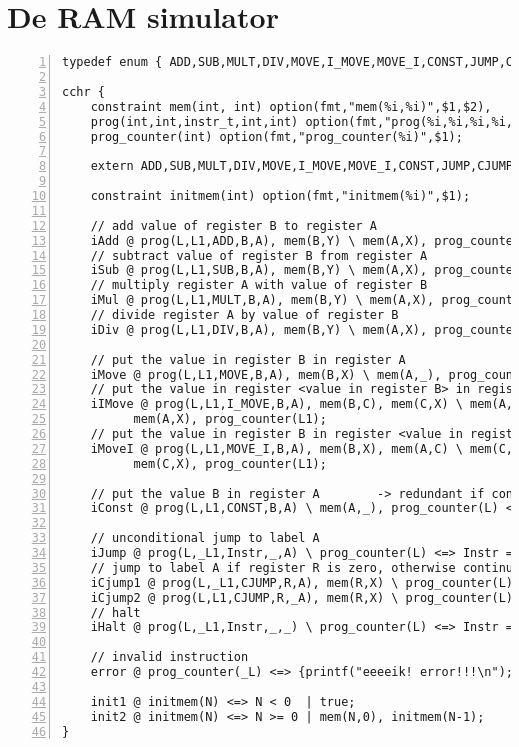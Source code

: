 \section{De RAM simulator} \label{sec:ram-cchr}

{\scriptsize
\begin{Verbatim}[frame=single,numbers=left]
typedef enum { ADD,SUB,MULT,DIV,MOVE,I_MOVE,MOVE_I,CONST,JUMP,CJUMP,HALT } instr_t;

cchr {
	constraint mem(int, int) option(fmt,"mem(%i,%i)",$1,$2), 
	prog(int,int,instr_t,int,int) option(fmt,"prog(%i,%i,%i,%i,%i)",$1,$2,$3,$4,$5),
	prog_counter(int) option(fmt,"prog_counter(%i)",$1);
	
	extern ADD,SUB,MULT,DIV,MOVE,I_MOVE,MOVE_I,CONST,JUMP,CJUMP,HALT;
		
	constraint initmem(int) option(fmt,"initmem(%i)",$1);
	
	// add value of register B to register A
	iAdd @ prog(L,L1,ADD,B,A), mem(B,Y) \ mem(A,X), prog_counter(L) <=> mem(A,X+Y), prog_counter(L1);
	// subtract value of register B from register A
	iSub @ prog(L,L1,SUB,B,A), mem(B,Y) \ mem(A,X), prog_counter(L) <=> mem(A,X-Y), prog_counter(L1);
	// multiply register A with value of register B
	iMul @ prog(L,L1,MULT,B,A), mem(B,Y) \ mem(A,X), prog_counter(L) <=> mem(A,X*Y), prog_counter(L1);
	// divide register A by value of register B
	iDiv @ prog(L,L1,DIV,B,A), mem(B,Y) \ mem(A,X), prog_counter(L) <=> mem(A,X/Y), prog_counter(L1);

	// put the value in register B in register A
	iMove @ prog(L,L1,MOVE,B,A), mem(B,X) \ mem(A,_), prog_counter(L) <=> mem(A,X), prog_counter(L1);
	// put the value in register <value in register B> in register A
	iIMove @ prog(L,L1,I_MOVE,B,A), mem(B,C), mem(C,X) \ mem(A,_), prog_counter(L) <=> 
          mem(A,X), prog_counter(L1);
	// put the value in register B in register <value in register A>
	iMoveI @ prog(L,L1,MOVE_I,B,A), mem(B,X), mem(A,C) \ mem(C,_), prog_counter(L) <=> 
          mem(C,X), prog_counter(L1);

	// put the value B in register A        -> redundant if consts are in init mem
	iConst @ prog(L,L1,CONST,B,A) \ mem(A,_), prog_counter(L) <=> mem(A,B), prog_counter(L1);

	// unconditional jump to label A
	iJump @ prog(L,_L1,Instr,_,A) \ prog_counter(L) <=> Instr == JUMP | prog_counter(A);
	// jump to label A if register R is zero, otherwise continue
	iCjump1 @ prog(L,_L1,CJUMP,R,A), mem(R,X) \ prog_counter(L) <=> X == 0 | prog_counter(A);
	iCjump2 @ prog(L,L1,CJUMP,R,_A), mem(R,X) \ prog_counter(L) <=> X != 0 | prog_counter(L1);
	// halt
	iHalt @ prog(L,_L1,Instr,_,_) \ prog_counter(L) <=> Instr == HALT | true;

	// invalid instruction
	error @ prog_counter(_L) <=> {printf("eeeeik! error!!!\n");};
		
	init1 @ initmem(N) <=> N < 0  | true;
	init2 @ initmem(N) <=> N >= 0 | mem(N,0), initmem(N-1);
}
\end{Verbatim}
}
